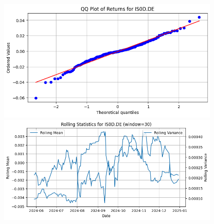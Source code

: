 \documentclass{article}%
\begin{document}
%


\begin{figure}[htbp]%
\begin{minipage}{0.48\textwidth}%
\includegraphics[width=\linewidth]{ticker_images/IS0D.DE_qq_plot.png}%
\end{minipage}%
\begin{minipage}{0.48\textwidth}%
\includegraphics[width=\linewidth]{ticker_images/IS0D.DE_rolling_stats.png}%
\end{minipage}%
\end{figure}

%
\end{document}
